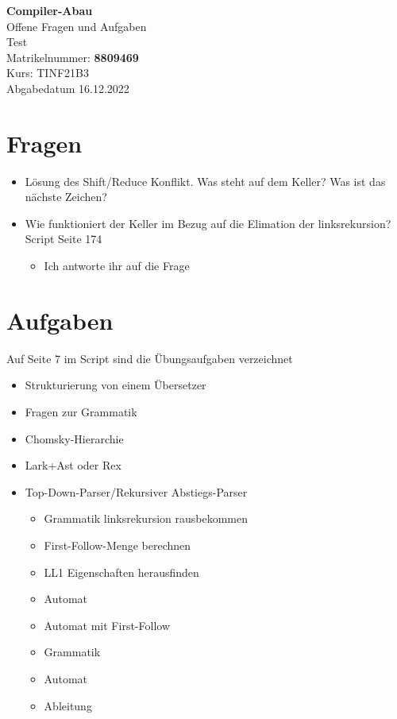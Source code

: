 \documentclass[
  ngerman
  ,12pt
  ,pdftex
]{article}
\begin{document}
\begin{titlepage}
  \begin{center}
      {\Huge \textbf{Compiler-Abau}}\\[1.5cm]
      {\Large Offene Fragen und Aufgaben}\\[1cm]
      {\Huge Test}\\[7cm]
      {\large Matrikelnummer: \textbf{8809469}}\\[0.5cm]
      {\large Kurs: TINF21B3}\\[0.5cm]
      {\large Abgabedatum 16.12.2022}
      \vfill
  \end{center}
\end{titlepage}
\newpage
\tableofcontents
\newpage
\section{Fragen}
\begin{itemize}
  \item Lösung des Shift/Reduce Konflikt. Was steht auf dem Keller? Was ist das nächste Zeichen?
  \item Wie funktioniert der Keller im Bezug auf die Elimation der linksrekursion? Script Seite 174
  \begin{itemize}
    \item []  Ich antworte ihr auf die Frage  
  \end{itemize}
\end{itemize}

\section{Aufgaben}
Auf Seite 7 im Script sind die Übungsaufgaben verzeichnet
\begin{itemize}
  \item Strukturierung von einem Übersetzer
  \item Fragen zur Grammatik
  \item Chomsky-Hierarchie
  \item Lark+Ast oder Rex
  \item Top-Down-Parser/Rekursiver Abstiegs-Parser
  \begin{itemize}
    \item Grammatik linksrekursion rausbekommen
    \item First-Follow-Menge berechnen 
    \item LL1 Eigenschaften herausfinden
    \item Automat
    \item Automat mit First-Follow
  \end{itemize}
  \begin{itemize}
    \item Grammatik 
    \item Automat
    \item Ableitung
  \end{itemize}
  
\end{itemize}
\end{document}
